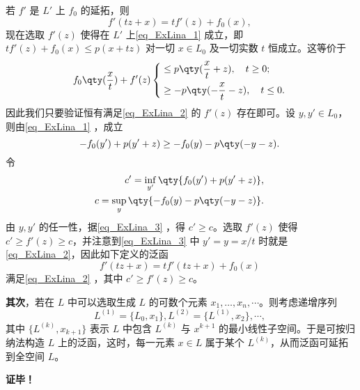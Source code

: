若 $f'$ 是 $L'$ 上 $f_0$ 的延拓，则
\begin{equation}
f'(tz+x)=tf'(z)+f_0(x),~
\end{equation}
现在选取 $f'(z)$ 使得在 $L'$ 上\autoref{eq_ExLina_1} 成立，即 $tf'(z)+f_0(x)\leq p(x+tz)$ 对一切 $x\in L_0$ 及一切实数 $t$ 恒成立。这等价于
\begin{equation}\label{eq_ExLina_2}
f_0\qty(\frac{x}{t})+f'(z)\left\{\begin{aligned}
&\leq p\qty(\frac{x}{t}+z),\quad t\geq 0;\\
&\geq -p\qty(-\frac{x}{t}-z),\quad t\leq 0.
\end{aligned}\right.
~
\end{equation}
因此我们只要验证恒有满足\autoref{eq_ExLina_2} 的 $f'(z)$ 存在即可。设 $y,y'\in L_0$，则由\autoref{eq_ExLina_1} ，成立
\begin{equation}\label{eq_ExLina_3}
-f_0(y')+p(y'+z)\geq -f_0(y)-p\qty(-y-z).~
\end{equation}
 令 
 \begin{equation}
 \begin{aligned}
 c'=\inf_{y'}\qty{f_0(y')+p(y'+z)},\\
 c=\sup_y\qty{-f_0(y)-p\qty(-y-z)}.
 \end{aligned}~
 \end{equation}
 由 $y,y'$ 的任一性，据\autoref{eq_ExLina_3} ，得 $c'\geq c$。选取 $f'(z)$ 使得 $c'\geq f'(z)\geq c$，并注意到\autoref{eq_ExLina_3} 中 $y'=y=x/t$ 时就是\autoref{eq_ExLina_2}，因此如下定义的泛函 
 \begin{equation}
 f'(tz+x)=tf'(tz+x)+f_0(x)~
 \end{equation}
 满足\autoref{eq_ExLina_2} ，其中 $c'\geq f'(z)\geq c$。

\textbf{其次}，若在 $L$ 中可以选取生成 $L$ 的可数个元素 $x_1,\dots,x_n,\cdots$。则考虑递增序列
\begin{equation}
L^{(1)}=\{L_0,x_1\},L^{(2)}=\{L^{(1)},x_2\},\cdots,~
\end{equation}
其中 $\{L^{(k)},x_{k+1}\}$ 表示 $L$ 中包含 $L^{(k)}$ 与 $x^{k+1}$ 的最小线性子空间。于是可按归纳法构造 $L$ 上的泛函，这时，每一元素 $x\in L$ 属于某个 $L^{(k)}$，从而泛函可延拓到全空间 $L$。 

\textbf{证毕！}



